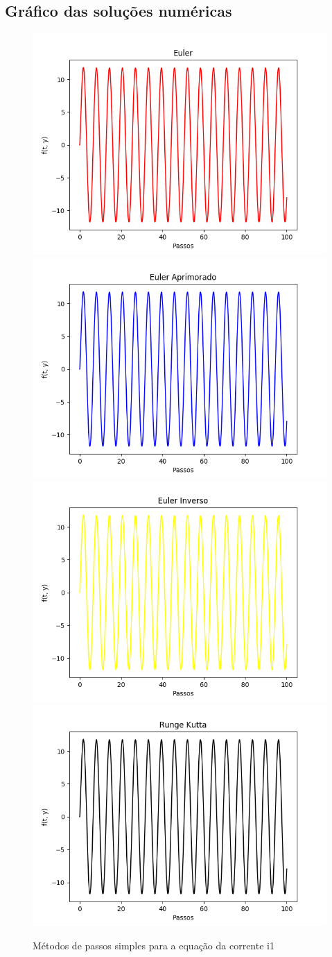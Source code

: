 \documentclass[12pt]{article}%
\begin{document}
    \subsection{Gráfico das soluções numéricas}
    \begin{figure}[H]
        \begin{center}
            \includegraphics[width=.4\textwidth]{problemas/metodos_q3/circuito_euler.png}
            \includegraphics[width=.4\textwidth]{problemas/metodos_q3/circuito_euler_aprimorado.png}
            \includegraphics[width=.4\textwidth]{problemas/metodos_q3/circuito_euler_inverso.png}
            \includegraphics[width=.4\textwidth]{problemas/metodos_q3/circuito_runge_kutta.png}
        \end{center}
        \caption{Métodos de passos simples para a equação da corrente i1}
    \end{figure}
\end{document}
